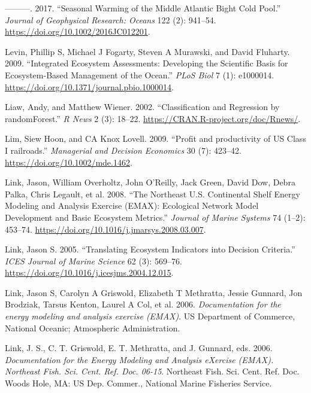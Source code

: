 \documentclass[
]{book}
\newlength{\cslhangindent}
\newenvironment{cslreferences}%
  {\setlength{\parindent}{0pt}%
  \everypar{\setlength{\hangindent}{\cslhangindent}}\ignorespaces}%
  {\par}
\begin{document}
\begin{cslreferences}
\leavevmode\hypertarget{ref-lentz_seasonal_2017}{}%
---------. 2017. ``Seasonal Warming of the Middle Atlantic Bight Cold Pool.'' \emph{Journal of Geophysical Research: Oceans} 122 (2): 941--54. \url{https://doi.org/10.1002/2016JC012201}.

\leavevmode\hypertarget{ref-levin_integrated_2009}{}%
Levin, Phillip S, Michael J Fogarty, Steven A Murawski, and David Fluharty. 2009. ``Integrated Ecosystem Assessments: Developing the Scientific Basis for Ecosystem-Based Management of the Ocean.'' \emph{PLoS Biol} 7 (1): e1000014. \url{https://doi.org/10.1371/journal.pbio.1000014}.

\leavevmode\hypertarget{ref-randomForest}{}%
Liaw, Andy, and Matthew Wiener. 2002. ``Classification and Regression by randomForest.'' \emph{R News} 2 (3): 18--22. \url{https://CRAN.R-project.org/doc/Rnews/}.

\leavevmode\hypertarget{ref-lim2009}{}%
Lim, Siew Hoon, and CA Knox Lovell. 2009. ``Profit and productivity of US Class I railroads.'' \emph{Managerial and Decision Economics} 30 (7): 423--42. \url{https://doi.org/10.1002/mde.1462}.

\leavevmode\hypertarget{ref-link_northeast_2008}{}%
Link, Jason, William Overholtz, John O'Reilly, Jack Green, David Dow, Debra Palka, Chris Legault, et al. 2008. ``The Northeast U.S. Continental Shelf Energy Modeling and Analysis Exercise (EMAX): Ecological Network Model Development and Basic Ecosystem Metrics.'' \emph{Journal of Marine Systems} 74 (1--2): 453--74. \url{https://doi.org/10.1016/j.jmarsys.2008.03.007}.

\leavevmode\hypertarget{ref-link_translating_2005}{}%
Link, Jason S. 2005. ``Translating Ecosystem Indicators into Decision Criteria.'' \emph{ICES Journal of Marine Science} 62 (3): 569--76. \url{https://doi.org/10.1016/j.icesjms.2004.12.015}.

\leavevmode\hypertarget{ref-link2006EMAX}{}%
Link, Jason S, Carolyn A Griswold, Elizabeth T Methratta, Jessie Gunnard, Jon Brodziak, Tarsus Kenton, Laurel A Col, et al. 2006. \emph{Documentation for the energy modeling and analysis exercise (EMAX)}. US Department of Commerce, National Oceanic; Atmospheric Administration.

\leavevmode\hypertarget{ref-link_documentation_2006}{}%
Link, J. S., C. T. Griswold, E. T. Methratta, and J. Gunnard, eds. 2006. \emph{Documentation for the Energy Modeling and Analysis eXercise (EMAX). Northeast Fish. Sci. Cent. Ref. Doc. 06-15}. Northeast Fish. Sci. Cent. Ref. Doc. Woods Hole, MA: US Dep. Commer., National Marine Fisheries Service.


\end{cslreferences}
\end{document}
